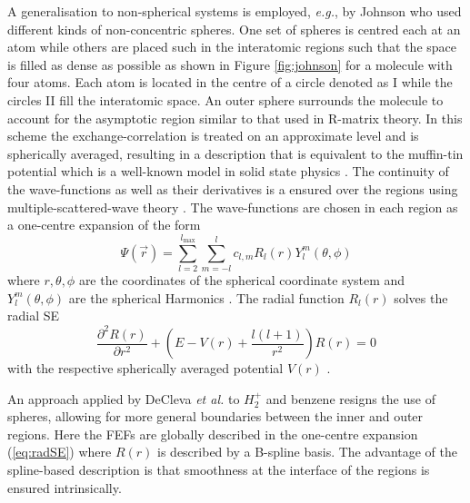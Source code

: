 {%
A generalisation to non-spherical systems is employed, \textit{e.g.}, by Johnson \cite{johnson} who used different kinds of non-concentric spheres.
One set of spheres is centred each at an atom while others are placed such in the interatomic regions such that the space is filled as dense as possible as shown in Figure \ref{fig:johnson} for a molecule with four atoms.
Each atom is located in the centre of a circle denoted as I while the circles II fill the interatomic space.
An outer sphere surrounds the molecule to account for the asymptotic region similar to that used in R-matrix theory.
In this scheme the exchange-correlation is treated on an approximate level \cite{slaterJohn} and is spherically averaged, resulting in a description that is equivalent to the muffin-tin potential which is a well-known model in solid state physics \cite{MufTin,MufTin1}.
The continuity of the wave-functions as well as their derivatives is a ensured over the regions using multiple-scattered-wave theory \cite{johnson}.
The wave-functions are chosen in each region as a one-centre expansion of the form
\begin{equation} \label{eq:radSE}
\Psi(\vec{r})=\sum_{l=2}^{l_\text{max}}\sum_{m=-l}^l c_{l,m} R_l(r) Y_l^m(\theta, \phi)
\end{equation}
where $r,\theta,\phi$ are the coordinates of the spherical coordinate system and $Y_l^m(\theta,\phi)$ are the spherical Harmonics \cite{Lifschitz}.
The radial function $R_l(r)$ solves the radial SE 
\begin{equation}
\frac{\partial^2 R(r)}{\partial r^2} + \left( E-V(r) + \frac{l(l+1)}{r^2} \right)R(r)=0
\end{equation}
with the respective spherically averaged potential $V(r)$ \cite{johnson}.

An approach applied by DeCleva \textit{et al.} to $H_2^+$ \cite{H2pDeCleva} and benzene \cite{DeClevaBenzene} resigns the use of spheres, allowing for more general boundaries between the inner and outer regions.
Here the FEFs are globally described in the one-centre expansion (\ref{eq:radSE}) where $R(r)$ is described by a B-spline basis. %
The advantage of the spline-based description is that smoothness at the interface of the regions is ensured intrinsically.

}

